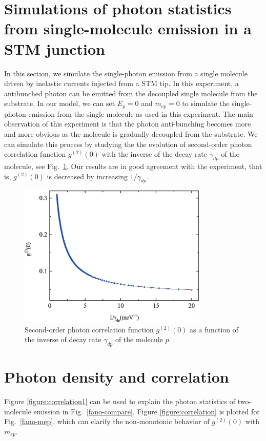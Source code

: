 \documentclass[aps,prb,
superscriptaddress,
,floatfix,footinbib,longbibliography,
preprint
]{revtex4-2}
\begin{document}
\section{Simulations of photon statistics from single-molecule emission in a STM junction}
\label{STM-emission}
In this section, we simulate the single-photon emission from a single molecule driven by inelastic currents injected from a STM tip\cite{zhang2017electrically}.
In this experiment, a antibunched photon can be emitted from the decoupled single molecule from the substrate. In our model, we can set $E_{p}=0$ and $m_{ep}=0$ to simulate the single-photon emission from the single molecule as used in this experiment. The main observation of this experiment is that the photon anti-bunching becomes more and more obvious as the molecule is gradually decoupled from the substrate. We can simulate this process by studying the the evolution of second-order photon correlation function $g^{(2)}(0)$ with the inverse of the decay rate $\gamma_{dp}$ of the molecule, see Fig.~\ref{figure:STM}. Our results are in good agreement with the experiment, that is, $g^{(2)}(0)$ is decreased by
increasing $1/\gamma_{dp}$.
%
\begin{figure}
\centering
\includegraphics[width=9cm]{stm.eps}
\caption{Second-order photon correlation function $g^{(2)}(0)$ as a function of the inverse of decay rate $\gamma_{dp}$ of the molecule $p$.}
\label{figure:STM}
\end{figure}

\section{Photon density and correlation}
Figure \ref{figure:correlation1} can be used to explain the photon statistics of two-molecule emission in Fig.~\ref{fano-compare}. Figure \ref{figure:correlation} is plotted for Fig.~\ref{fano-mep}, which can clarify the non-monotonic behavior of $g^{(2)}(0)$ with $m_{ep}$.
\end{document}
